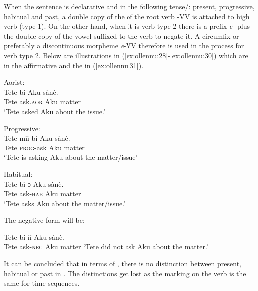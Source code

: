 \documentclass[output=paper
,newtxmath
,modfonts
,nonflat]{langsci/langscibook}
\begin{document}
When the sentence is declarative and in the following tense/: present, progressive, habitual and past, a double copy of the  of the root verb -VV is attached to high  verb (type 1). On the other hand, when it is verb type 2 there is a prefix \textit{e-} plus the double copy of the vowel suffixed to the verb to negate it. A circumfix or preferably a discontinuous morpheme \textit{e}-VV therefore is used in the  process for verb type 2. Below are illustrations in (\ref{ex:ollennu:28}-\ref{ex:ollennu:30}) which are in the affirmative and the  in (\ref{ex:ollennu:31}).

\ea \label{ex:ollennu:28} 
Aorist:\\
\gll Tete b\'i Aku s\`an\`e.\\
Tete ask.\textsc{aor} Aku matter\\
\glt `Tete asked Aku about the issue.'
\z

\ea \label{ex:ollennu:29}
Progressive: \\
\gll Tete m\`i\`i-b\'i Aku s\`an\`e.\\
Tete \textsc{prog}-ask Aku matter\\
\glt `Tete is asking Aku about the matter/issue'
\z

\ea \label{ex:ollennu:30}
Habitual: \\
\gll Tete b\`i-ɔ Aku s\`an\`e.\\
Tete ask-\textsc{hab} Aku matter\\
\glt`Tete asks Aku about the matter/issue.'
\z

The negative form will be:

\ea \label{ex:ollennu:31}
Tete b\'i-\'i\'i Aku s\`an\`e.\\
Tete ask-\textsc{neg} Aku matter
\glt `Tete did not ask Aku about the matter.'
\z

It can be concluded that in terms of , there is no distinction between present, habitual or past in . The distinctions get lost as the  marking on the verb is the same for time sequences.
\end{document}
